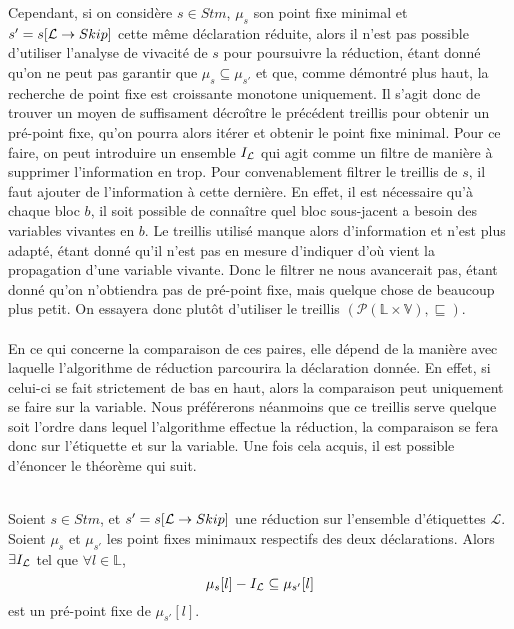 \documentclass[a4paper, 11pt]{article}
\begin{document}
Cependant, si on considère $s \in Stm$, $\mu_s$ son point fixe minimal et $s' = s[\mathcal{L} \rightarrow{Skip}]$ cette même déclaration
réduite, alors il n'est pas possible d'utiliser l'analyse de vivacité de $s$ pour poursuivre la réduction, étant donné qu'on ne peut pas garantir que
$\mu_{s} \subseteq \mu_{s'}$ et que, comme démontré plus haut, la recherche de point fixe est croissante monotone uniquement. 
Il s'agit donc de trouver un moyen de suffisament décroître le précédent treillis pour obtenir un pré-point fixe, qu'on pourra alors itérer et obtenir
le point fixe minimal.
Pour ce faire, on peut introduire un ensemble $I_{\mathcal{L}}$ qui agit comme un filtre de manière à supprimer l'information en trop. 
Pour convenablement filtrer le treillis de $s$, il faut ajouter de l'information à cette dernière. 
En effet, il est nécessaire qu'à chaque bloc $b$, il soit possible de connaître quel bloc sous-jacent
a besoin des variables vivantes en $b$. Le treillis utilisé manque alors d'information et n'est plus adapté, étant donné qu'il n'est pas en mesure
d'indiquer d'où vient la propagation d'une variable vivante. Donc le filtrer ne nous avancerait pas, étant donné qu'on n'obtiendra pas de
pré-point fixe, mais quelque chose de beaucoup plus petit. On essayera donc plutôt d'utiliser le treillis $(\mathcal{P}(\mathbb{L} \times \mathbb{V}), \sqsubseteq)$. 
\\
\\
En ce qui concerne la comparaison de ces paires, elle dépend de la manière avec laquelle l'algorithme de réduction parcourira la déclaration donnée.
En effet, si celui-ci se fait strictement de bas en haut, alors la comparaison peut uniquement se faire sur la variable. Nous préférerons néanmoins
que ce treillis serve quelque soit l'ordre dans lequel l'algorithme effectue la réduction, la comparaison se fera donc sur l'étiquette
et sur la variable. Une fois cela acquis, il est possible d'énoncer le théorème qui suit.
\\
\\
\begin{theorem}
	Soient $s \in Stm$, et $s' = s[\mathcal{L} \rightarrow{Skip}]$ une réduction sur
	l'ensemble d'étiquettes $\mathcal{L}$. Soient $\mu_s$ et $\mu_{s'}$ les point fixes minimaux respectifs
	des deux déclarations.
	Alors $\exists I_{\mathcal{L}}$ tel que $\forall l \in \mathbb{L}$,
	\[
		\mu_s[l] - I_{\mathcal{L}} \subseteq \mu_{s'}[l]
	\]
	est un pré-point fixe de $\mu_{s'}[l]$.
\end{theorem}
\\
\\
\end{document}
